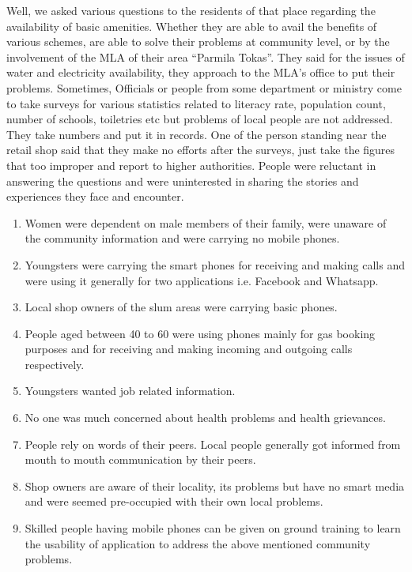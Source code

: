 \begin{enumerate}
Well, we asked various questions to the residents of that place regarding the
availability of basic amenities. Whether they are able to avail the benefits of various
schemes, are able to solve their problems at community level, or by the involvement
of the MLA of their area “Parmila Tokas”. They said for the issues of water and
electricity availability, they approach to the MLA’s office to put their problems.
Sometimes, Officials or people from some department or ministry come to take
surveys for various statistics related to literacy rate, population count, number of
schools, toiletries etc but problems of local people are not addressed. They take
numbers and put it in records. One of the person standing near the retail shop said
that they make no efforts after the surveys, just take the figures that too improper
and report to higher authorities. People were reluctant in answering the questions and were uninterested in sharing
the stories and experiences they face and encounter.

\begin{enumerate}
\item  Women were dependent on male members of their family, were unaware of the community information and were carrying no mobile phones.
\item Youngsters were carrying the smart phones for receiving and making calls
and were using it generally for two applications i.e. Facebook and Whatsapp.
\item Local shop owners of the slum areas were carrying basic phones.
\item People aged between 40 to 60 were using phones mainly for gas booking
purposes and for receiving and making incoming and outgoing calls
respectively.
\item Youngsters wanted job related information.
\item No one was much concerned about health problems and health grievances.
\item People rely on words of their peers. Local people generally got informed from
mouth to mouth communication by their peers.
\item Shop owners are aware of their locality, its problems but have no smart
media and were seemed pre-occupied with their own local problems.

\item Skilled people having mobile phones can be given on ground training to learn the usability of application to address the above mentioned community problems.


\end{enumerate}
\end{enumerate}
